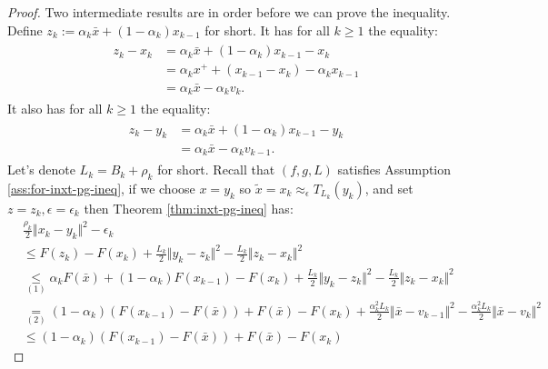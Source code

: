 \documentclass[12pt]{article}
\begin{document}
    \begin{proof}
        Two intermediate results are in order before we can prove the inequality. 
        Define $z_k := \alpha_k \bar x + (1 - \alpha_k)x_{k - 1}$ for short. 
        It has for all $k \ge 1$ the equality: 
        \begin{align}\tag{a}\label{eqn:inxt-apg-cnvg-prep1-a}\begin{split}
            z_k - x_k &= 
            \alpha_k \bar x + (1 - \alpha_k)x_{k - 1} - x_k
            \\
            &= \alpha_kx^+ + (x_{k - 1} - x_k) - \alpha_kx_{k - 1}
            \\
            &= \alpha_k \bar x - \alpha_k v_k. 
        \end{split}\end{align}
        It also has for all $k \ge 1$ the equality: 
        \begin{align}\tag{b}\label{eqn:inxt-apg-cnvg-prep1-b}\begin{split}
            z_k - y_k &= 
            \alpha_k \bar x + (1 - \alpha_k)x_{k - 1} - y_k
            \\
            &= \alpha_k \bar x - \alpha_k v_{k - 1}. 
        \end{split}\end{align}
        Let's denote $L_k = B_k + \rho_k$ for short. 
        Recall that $(f, g, L)$ satisfies Assumption \ref{ass:for-inxt-pg-ineq}, if we choose $x = y_k$ so $\tilde x = x_k \approx_\epsilon T_{L_k}(y_k)$, and set $z = z_k, \epsilon = \epsilon_k$ then Theorem \ref{thm:inxt-pg-ineq} has: 
        \begin{align*}
            & \frac{\rho_k}{2}\Vert x_k - y_k\Vert^2 - \epsilon_k
            \\
            &\le
            F(z_k) - F(x_k) + \frac{L_k}{2}\Vert y_k - z_k\Vert^2 - \frac{L_k}{2}\Vert z_k - x_k\Vert^2
            \\
            &\underset{(1)}{\le} \alpha_k F(\bar x) + (1 - \alpha_k)F(x_{k - 1}) - F(x_k)
            + \frac{L_k}{2}\Vert y_k - z_k\Vert^2 - \frac{L_k}{2}\Vert z_k - x_k\Vert^2
            \\
            &\underset{(2)}{=} 
            (1 - \alpha_k)(F(x_{k - 1}) - F(\bar x)) + F(\bar x) - F(x_k) 
            + \frac{\alpha_k^2L_k}{2}\Vert \bar x - v_{k - 1}\Vert^2 
            - \frac{\alpha_k^2L_k}{2}\Vert \bar x - v_{k}\Vert^2 
            \\
            &\le 
            (1 - \alpha_k)(F(x_{k - 1}) - F(\bar x)) + F(\bar x) - F(x_k) 

\end{align*}
\end{proof}
\end{document}
